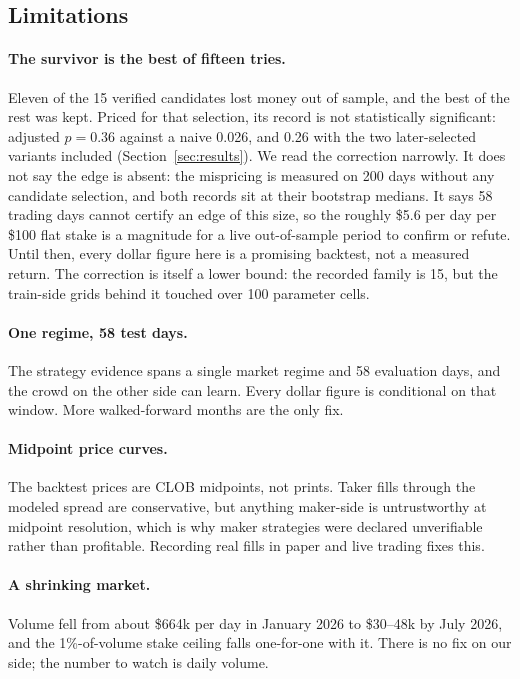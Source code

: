 \subsection{Limitations}

\paragraph{The survivor is the best of fifteen tries.} Eleven of the 15
verified candidates lost money out of sample, and the best of the rest was
kept. Priced for that selection, its record is not statistically
significant: adjusted $p = 0.36$ against a naive 0.026, and 0.26 with the
two later-selected variants included
(Section~\ref{sec:results}). We read the correction narrowly. It does not
say the edge is absent: the mispricing is measured on 200 days without any
candidate selection, and both records sit at their bootstrap medians. It
says 58 trading days cannot certify an edge of this size, so the roughly
\$5.6 per day per \$100 flat stake is a magnitude for a live out-of-sample
period to confirm or refute. Until then, every dollar figure here
is a promising backtest, not a measured return. The correction is itself a
lower bound: the recorded family is 15, but the train-side grids behind it
touched over 100 parameter cells.

\paragraph{One regime, 58 test days.} The strategy evidence spans a single
market regime and 58 evaluation days, and the crowd on the other side can
learn. Every dollar figure is conditional on that window. More
walked-forward months are the only fix.

\paragraph{Midpoint price curves.} The backtest prices are CLOB midpoints,
not prints. Taker fills through the modeled spread are conservative, but
anything maker-side is untrustworthy at midpoint resolution, which is
why maker strategies were declared unverifiable rather than profitable.
Recording real fills in paper and live trading fixes this.

\paragraph{A shrinking market.} Volume fell from about \$664k per day in
January 2026 to \$30--48k by July 2026, and the 1\%-of-volume stake
ceiling falls one-for-one with it. There is no fix on our side; the number
to watch is daily volume.

